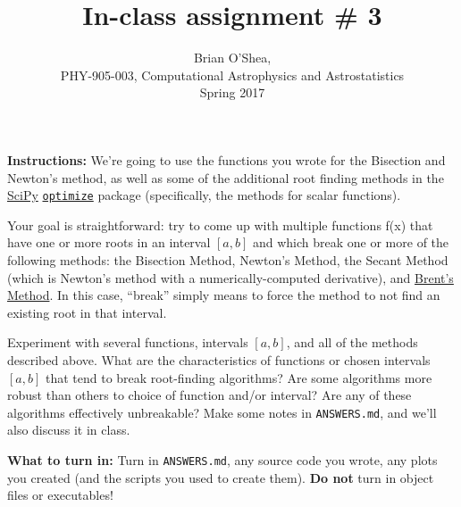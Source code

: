 \documentclass[10pt]{article}
\title{In-class assignment \# 3}
\author{Brian O'Shea, \\PHY-905-003, Computational Astrophysics and
  Astrostatistics\\Spring 2017}
\date{} %
\begin{document}
 
\maketitle

\vspace{-5mm}

\noindent \textbf{Instructions:} We're going to use the functions you
wrote for the Bisection and Newton's method, as well as some of the
additional root finding methods in the
\href{https://docs.scipy.org}{SciPy}
\href{https://docs.scipy.org/doc/scipy-0.18.1/reference/optimize.html#root-finding}{\texttt{optimize}}
package (specifically, the methods for scalar functions).

Your goal is straightforward: try to come up with multiple functions
f(x) that have one or more roots in an interval $[a,b]$ and which
break one or more of the following methods: the Bisection Method,
Newton's Method, the Secant Method (which is Newton's method with a
numerically-computed derivative), and
\href{http://mathworld.wolfram.com/BrentsMethod.html}{Brent's Method}.
In this case, ``break'' simply means to force the method to not find
an existing root in that interval.

Experiment with several functions, intervals $[a,b]$, and all of the methods described
above.  What are the characteristics of functions or chosen intervals
$[a,b]$ that tend to break root-finding algorithms?  Are some
algorithms more robust than others to choice of function and/or interval?  Are any of these algorithms
effectively unbreakable?  Make some notes in \texttt{ANSWERS.md}, and
we'll also discuss it in class.

\vspace{5mm}

\noindent 
\textbf{What to turn in:} Turn in \texttt{ANSWERS.md}, any
source code you wrote, any plots you created (and the scripts you used
to create them).  \textbf{Do not} turn in object files or
executables!
\end{document}
